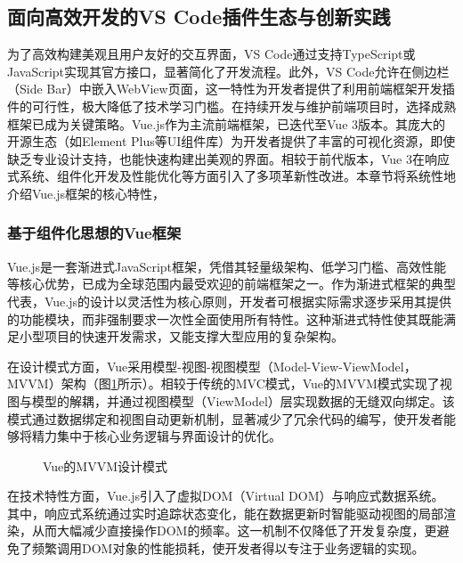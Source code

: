 \documentclass[UTF8,a4paper,12pt]{ctexart}
\numberwithin{equation}{section}
\begin{document}
\subsection{面向高效开发的VS Code插件生态与创新实践}
为了高效构建美观且用户友好的交互界面，VS Code通过支持TypeScript或JavaScript实现其官方接口，显著简化了开发流程。此外，VS Code允许在侧边栏（Side Bar）中嵌入WebView页面，这一特性为开发者提供了利用前端框架开发插件的可行性，极大降低了技术学习门槛。在持续开发与维护前端项目时，选择成熟框架已成为关键策略。Vue.js作为主流前端框架，已迭代至Vue 3版本。其庞大的开源生态（如Element Plus等UI组件库）为开发者提供了丰富的可视化资源，即使缺乏专业设计支持，也能快速构建出美观的界面。相较于前代版本，Vue 3在响应式系统、组件化开发及性能优化等方面引入了多项革新性改进。本章节将系统性地介绍Vue.js框架的核心特性，\par
\subsubsection{基于组件化思想的Vue框架}
Vue.js是一套渐进式JavaScript框架，凭借其轻量级架构、低学习门槛、高效性能等核心优势，已成为全球范围内最受欢迎的前端框架之一。作为渐进式框架的典型代表，Vue.js的设计以灵活性为核心原则，开发者可根据实际需求逐步采用其提供的功能模块，而非强制要求一次性全面使用所有特性。这种渐进式特性使其既能满足小型项目的快速开发需求，又能支撑大型应用的复杂架构。\par
在设计模式方面，Vue采用模型-视图-视图模型（Model-View-ViewModel，MVVM）架构（图\ref{MVVM}所示）。相较于传统的MVC模式，Vue的MVVM模式实现了视图与模型的解耦，并通过视图模型（ViewModel）层实现数据的无缝双向绑定。该模式通过数据绑定和视图自动更新机制，显著减少了冗余代码的编写，使开发者能够将精力集中于核心业务逻辑与界面设计的优化。\par
\begin{figure}[H]
	\caption{Vue的MVVM设计模式}
	\label{MVVM}
\end{figure}
在技术特性方面，Vue.js引入了虚拟DOM（Virtual DOM）与响应式数据系统。其中，响应式系统通过实时追踪状态变化，能在数据更新时智能驱动视图的局部渲染，从而大幅减少直接操作DOM的频率。这一机制不仅降低了开发复杂度，更避免了频繁调用DOM对象的性能损耗，使开发者得以专注于业务逻辑的实现。\par
\end{document}
